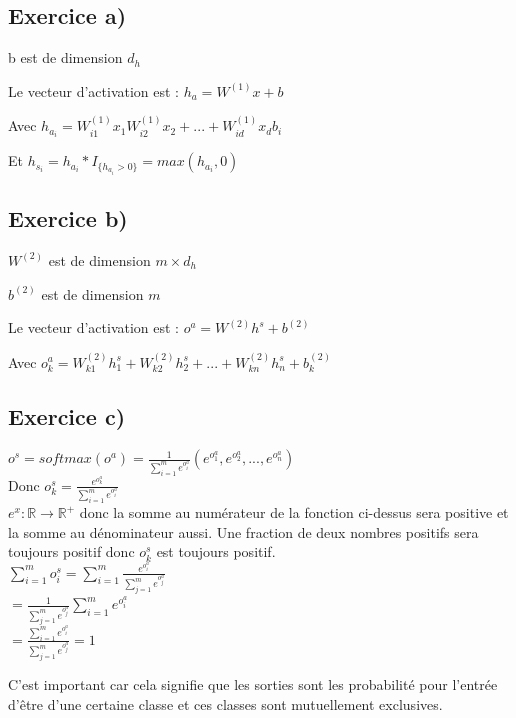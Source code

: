 \documentclass[a4paper,10pt]{article}
\begin{document}
\subsection{Exercice a)}

b est de dimension $d_{h}$

Le vecteur d'activation est : $h_{a} = W^{(1)}x +b$

Avec $ h_{a_i} = W^{(1)}_{i1} x_{1}  W^{(1)}_{i2} x_{2} + ... + W^{(1)}_{id} x_{d} b_{i}$

Et $h_{s_i} = h_{a_i}*I_{ \{ h_{a_i} > 0 \} } = max(h_{a_i}, 0)$

\subsection{Exercice b)}

$W^{(2)}$ est de dimension $m \times d_{h}$

$b^{(2)}$ est de dimension $m$

Le vecteur d'activation est : $o^{a} = W^{(2)} h^{s} + b^{(2)}$

Avec $o^{a}_{k} = W^{(2)}_{k1} h^s_1 + W^{(2)}_{k2} h^s_2 + ... + W^{(2)}_{kn} h^s_n + b^{(2)}_{k}$

\subsection{Exercice c)}

$o^{s} = softmax(o^{a}) = \frac{1}{\sum_{i=1}^{m} e^{o^{a}_{i}}}  (e^{o^{a}_{1}}, e^{o^{a}_{2}}, ..., e^{o^{a}_{n}})$
\\[6pt]
Donc $o^{s}_{k} = \frac{e^{o^{a}_{k}}}{\sum_{i=1}^{m} e^{o^{a}_{i}}}$
\\[6pt]
$e^{x} : \mathds{R} \rightarrow \mathds{R}^{+}$ donc la somme au numérateur de la fonction ci-dessus sera positive et la somme au dénominateur aussi. Une fraction de deux nombres positifs sera toujours positif donc $o^{s}_{k}$ est toujours positif.
\\[6pt]
$\sum^{m}_{i=1} o^{s}_{i} = \sum^{m}_{i=1} \frac{e^{o^{a}_{i}}}{\sum_{j=1}^{m} e^{o^{a}_{j}}}$
\\[6pt]
$ = \frac{1}{\sum_{j=1}^{m} e^{o^{a}_{j}}} \sum^{m}_{i=1} e^{o^{a}_{i}}$
\\[6pt]
$ = \frac{\sum^{m}_{i=1} e^{o^{a}_{i}}}{\sum_{j=1}^{m} e^{o^{a}_{j}}}=1$


C'est important car cela signifie que les sorties sont les probabilité pour l'entrée d'être d'une certaine classe et ces classes sont mutuellement exclusives.
\end{document}
